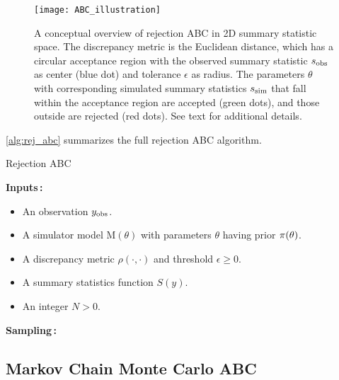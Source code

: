 \begin{figure}[!htb]
    \centering 
    \texttt{[image: ABC\_illustration]}
    \caption{A conceptual overview of rejection ABC in 2D summary statistic space. The discrepancy metric is the Euclidean distance, which has a circular acceptance region with the observed summary statistic $s_\mathrm{obs}$ as center (blue dot) and tolerance $\epsilon$ as radius. The parameters $\theta$ with corresponding simulated summary statistics $s_\mathrm{sim}$ that fall within the acceptance region are accepted (green dots), and those outside are rejected (red dots). See text for additional details.}
    \label{fig:abc_illustration}
\end{figure}

\cref{alg:rej_abc} summarizes the full rejection ABC algorithm.

\begin{algorithm}[H]
\caption{Rejection ABC}
\label{alg:rej_abc}
\SetAlgoLined
\DontPrintSemicolon
 \textbf{Inputs\,:}\;
 \vspace{-5mm}
 \begin{itemize}
     \item An observation $y_\mathrm{obs}$. 
     \item A simulator model $\mathrm{M}(\theta)$ with parameters $\theta$ having prior $\pi \qty(\theta)$.
     \item A discrepancy metric $\rho(\cdot, \cdot)$ and threshold $\epsilon \geq 0$. 
     \item A summary statistics function $S(y)$. 
     \item An integer $N>0$.
 \end{itemize}
 
 \vspace{5mm}
 \textbf{Sampling\,:}\;
\end{algorithm}


\subsection{Markov Chain Monte Carlo ABC}

